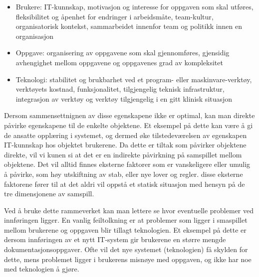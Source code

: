 \begin{itemize}
\item Brukere: IT-kunnskap, motivasjon og interesse for oppgaven som skal utføres, fleksibilitet og åpenhet for endringer i arbeidsmåte, team-kultur, organisatorisk kontekst, sammarbeidet innenfor team og politikk innen en organisasjon
\item Oppgave: organisering av oppgavene som skal gjennomføres, gjensidig avhengighet mellom oppgavene og oppgavenes grad av kompleksitet
\item Teknologi: stabilitet og brukbarhet ved et program- eller maskinvare-verktøy, verktøyets kostnad, funksjonalitet, tilgjengelig teknisk infrastruktur, integrasjon av verktøy og verktøy tilgjengelig i en gitt klinisk situasjon
\end{itemize}

\noindent
Dersom sammensettnignen av disse egenskapene ikke er optimal, kan man direkte påvirke egenskapene til de enkelte objektene. Et eksempel på dette kan være å gi de ansatte opplæring i systemet, og dermed øke tilstedeværelsen av egenskapen IT-kunnskap hos objektet brukerene. Da dette er tiltak som påvirker objektene direkte, vil vi kunen si at det er en indirekte påvirkning på samspillet mellom objektene.
Det vil alltid finnes eksterne faktorer som er vanskeligere eller umulig å påvirke, som høy utskiftning av stab, eller nye lover og regler. disse eksterne faktorene fører til at det aldri vil oppstå et statisk situasjon med hensyn på de tre dimensjonene av samspill. 

\noindnet
Ved å bruke dette rammeverket kan man lettere se hvor eventuelle problemer ved innføringen ligger. En vanlig feiltolkning er at problemer som ligger i smaspillet mellom brukerene og oppgaven blir tillagt teknologien. Et eksempel på dette er dersom innføringen av et nytt IT-system gir brukerene en større mengde dokumentasjonsoppgaver. Ofte vil det nye systemet (teknologien) få skylden for dette, mens problemet ligger i brukerens misnøye med oppgaven, og ikke har noe med teknologien å gjøre.

